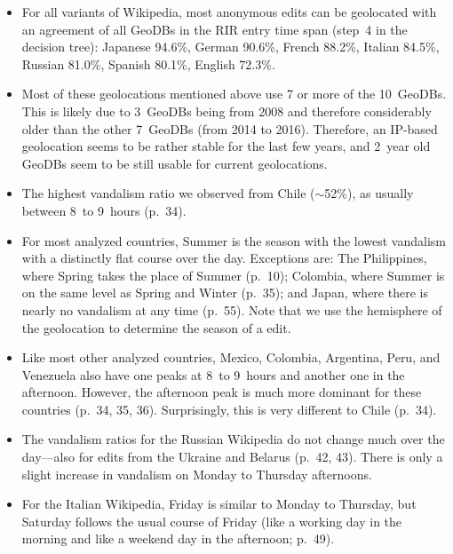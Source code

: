 \documentclass[letterpaper]{article}
\begin{document}
\begin{itemize}
\item
For all variants of Wikipedia, most anonymous edits can be geolocated with an agreement of all GeoDBs in the RIR entry time span (step~4 in the decision tree):
Japanese 94.6\%,
German 90.6\%,
French 88.2\%,
Italian 84.5\%,
Russian 81.0\%,
Spanish 80.1\%,
English 72.3\%.
\item
Most of these geolocations mentioned above use 7 or more of the 10~GeoDBs. This is likely due to 3~GeoDBs being from 2008 and therefore considerably older than the other 7~GeoDBs (from 2014 to 2016). Therefore, an IP-based geolocation seems to be rather stable for the last few years, and 2~year old GeoDBs seem to be still usable for current geolocations.
\end{itemize}

\begin{itemize}
\item
The highest vandalism ratio we observed from Chile ($\sim$52\%), as usually between 8~to 9~hours (p.\ 34).
\item
For most analyzed countries, Summer is the season with the lowest vandalism with a distinctly flat course over the day. Exceptions are:
The Philippines, where Spring takes the place of Summer (p.\ 10);
Colombia, where Summer is on the same level as Spring and Winter (p.\ 35);
and Japan, where there is nearly no vandalism at any time (p.\ 55).
Note that we use the hemisphere of the geolocation to determine the season of a edit.
\item
Like most other analyzed countries, Mexico, Colombia, Argentina, Peru, and Venezuela also have one peaks at 8~to 9~hours and another one in the afternoon. However, the afternoon peak is much more dominant for these countries (p.\ 34, 35, 36). Surprisingly, this is very different to Chile (p.\ 34).
\item
The vandalism ratios for the Russian Wikipedia do not change much over the day---also for edits from the Ukraine and Belarus (p.\ 42, 43). There is only a slight increase in vandalism on Monday to Thursday afternoons.
\item
For the Italian Wikipedia, Friday is similar to Monday to Thursday, but Saturday follows the usual course of Friday (like a working day in the morning and like a weekend day in the afternoon; p.\ 49).
\end{itemize}
\onecolumn
\clearpage
\end{document}
